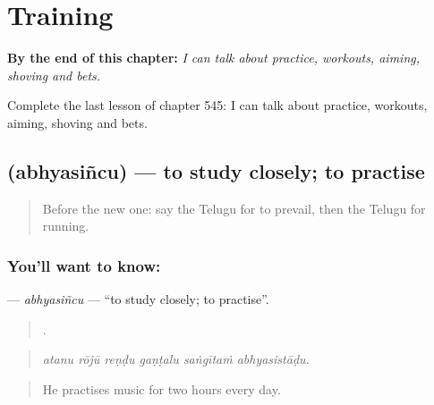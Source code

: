 
\chapter{Training}
\label{ch:te-training}

\begin{chapteropening}
\textbf{By the end of this chapter:} \emph{I can talk about practice, workouts, aiming, shoving and bets.}

Complete the last lesson of chapter 545: I can talk about practice, workouts, aiming, shoving and bets.
\end{chapteropening}

\section[\texorpdfstring{\te{అభ్యసించు} (abhyasiñcu)}{అభ్యసించు (abhyasiñcu)}]{ (abhyasiñcu) — to study closely; to practise}

\label{lesson:TE-C545-abhyasincu}



\begin{quote}
Before the new one: say the Telugu for to prevail, then the Telugu for running.
\end{quote}

\subsection*{You'll want to know: }
\textbf{} — \emph{abhyasiñcu} — \textquotedblleft{}to study closely; to practise\textquotedblright{}.

\begin{quote}
     .
\end{quote}

\begin{quote}
\emph{atanu rōjū reṇḍu gaṇṭalu saṅgītaṁ abhyasistāḍu.}
\end{quote}

\begin{quote}
He practises music for two hours every day.
\end{quote}

